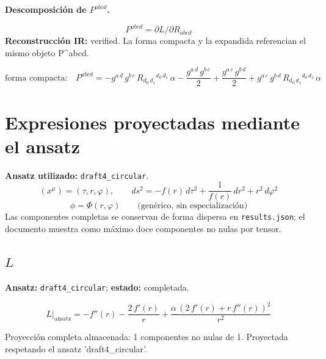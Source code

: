 \documentclass[11pt]{article}
\begin{document}
\par\medskip\noindent\textbf{Descomposición de $ P^{abcd} $.}\par
\begin{dmath*}[breakdepth={5}]
P^{abcd}=\partial L/\partial R_{abcd}
\end{dmath*}
\textbf{Reconstrucción IR:} verified. La forma compacta y la expandida referencian el mismo objeto P^{abcd}.\par
\begin{dmath*}[breakdepth={5}]
\text{forma compacta:}\quad P^{abcd} = -g{}^{a\,d}\,g{}^{b\,c}\,R{}_{d_{0}\,d_{1}}{}^{d_{0}\,d_{1}}\,\alpha - \frac{g{}^{a\,d}\,g{}^{b\,c}}{2} + \frac{g{}^{a\,c}\,g{}^{b\,d}}{2} + g{}^{a\,c}\,g{}^{b\,d}\,R{}_{d_{0}\,d_{1}}{}^{d_{0}\,d_{1}}\,\alpha
\end{dmath*}
\section*{Expresiones proyectadas mediante el ansatz}
\textbf{Ansatz utilizado:} \texttt{draft4\_circular}.
\begin{dmath*}[breakdepth={3}]
(x^\mu)=\left(\tau, r, \varphi\right),\qquad ds^2 = -f\!\left(r\right)\,d\tau^2 + \frac{1}{f\!\left(r\right)}\,dr^2 + {r}^{2}\,d\varphi^2
\end{dmath*}
\begin{dmath*}[breakdepth={3}]
\phi = \Phi\!\left(r, \varphi\right)\qquad\text{(genérico, sin especialización)}
\end{dmath*}
Las componentes completas se conservan de forma dispersa en \texttt{results.json}; el documento muestra como máximo doce componentes no nulas por tensor.
\subsection*{$ L $}
\textbf{Ansatz:} \texttt{draft4\_circular}; \textbf{estado:} completada.\par
\begin{dmath*}[breakdepth={5}]
L\big|_{\mathrm{ansatz}} = -f''\!\left(r\right) - \frac{2\,f'\!\left(r\right)}{r} + \frac{\alpha\,{\left(2\,f'\!\left(r\right) + r\,f''\!\left(r\right)\right)}^{2}}{{r}^{2}}
\end{dmath*}
\par\smallskip
Proyección completa almacenada: 1 componentes no nulas de 1. Proyectada respetando el ansatz 'draft4\_circular'.\par\medskip
{}
\end{document}
